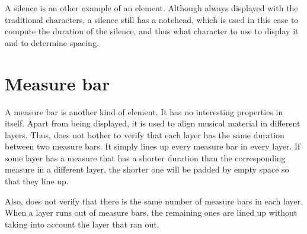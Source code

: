 A silence is an other example of an element.  Although always
displayed with the traditional characters, a silence still has a
notehead, which is used in this case to compute the duration of the
silence, and thus what character to use to display it and to determine
spacing. 

\section{Measure bar}

A measure bar is another kind of element.  It has no interesting
properties in itself.  Apart from being displayed, it is used to align
musical material in different layers.  Thus, {\gs} does not bother to
verify that each layer has the same duration between two measure
bars.  It simply lines up every measure bar in every layer.  If some
layer has a measure that has a shorter duration than the corresponding
measure in a different layer, the shorter one will be padded by empty
space so that they line up. 

Also, {\gs} does not verify that there is the same number of measure
bars in each layer.  When a layer runs out of measure bars, the
remaining ones are lined up without taking into account the layer that
ran out. 
